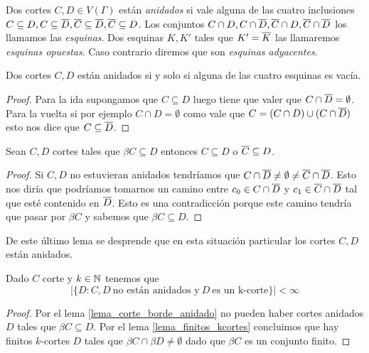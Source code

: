 \documentclass[tesis.tex]{subfiles}
\begin{document}
\begin{deff}
	Dos cortes $C,D \in V(\Gamma)$ están \emph{anidados} si vale alguna de las cuatro inclusiones $C \subseteq D, C \subseteq \overline D, \overline C \subseteq \overline D, \overline C \subseteq D$.
	Los conjuntos $C \cap D, C \cap \overline D, \overline C \cap D, \overline C \cap \overline D$ los llamamos las \emph{esquinas}.
	Dos esquinas $K,K'$ tales que $K' = \overline K$ las llamaremos \emph{esquinas opuestas}.
	Caso contrario diremos que son \emph{esquinas adyacentes}.
\end{deff}

\begin{lema}
	Dos cortes $C,D$ están anidados si y solo si alguna de las cuatro esquinas es vacía.
\end{lema}
\begin{proof}
	Para la ida supongamos que $C \subseteq D$ luego tiene que valer que $C \cap \overline D = \emptyset$.
	Para la vuelta si por ejemplo $C \cap D = \emptyset$ como vale que $C = (C \cap D) \cup (C \cap \overline D)$ esto nos dice que $C \subseteq \overline D$.
	
\end{proof}

\begin{lema}\label{lema_corte_borde_anidado}
	Sean $C,D$ cortes tales que $\beta C \subseteq D$ entonces $C \subseteq D$ o $\overline C \subseteq D$.
\end{lema}
\begin{proof}
	Si $C,D$ no estuvieran anidados tendríamos que $C \cap \overline D \neq \emptyset \neq \overline C \cap \overline D$.
	Esto nos diría que podríamos tomarnos un camino entre $c_0 \in C \cap \overline D$ y $c_1 \in \overline C \cap \overline D$ tal que esté contenido en $\overline D$.
	Esto es una contradicción porque este camino tendría que pasar por $\beta C$ y sabemos que $\beta C \subseteq D$.
	
\end{proof}

De este último lema se desprende que en esta situación particular los cortes $C,D$ están anidados.

\begin{lema}
	Dado $C$ corte y $k \in \mathbb{N}$ tenemos que 
	\[
	| \{  D : C, D \ \text{no están anidados y} \ D \ \text{es un k-corte}   \} | < \infty
	\]
\end{lema}
\begin{proof}
	Por el lema \ref{lema_corte_borde_anidado} no pueden haber cortes anidados $D$ tales que $\beta C \subseteq D$.
	Por el lema \ref{lema_finitos_kcortes} concluimos que hay finitos $k$-cortes $D$ tales que $\beta C \cap \beta D \neq \emptyset$ dado que $\beta C$ es un conjunto finito.
				
\end{proof}
\end{document}
